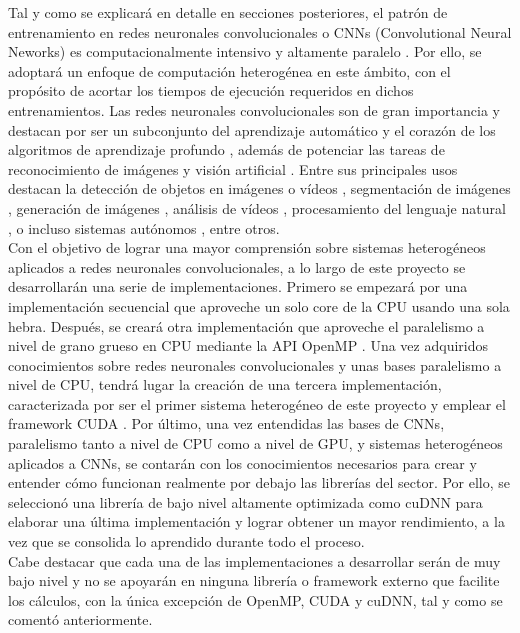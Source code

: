 Tal y como se explicará en detalle en secciones posteriores, el patrón de entrenamiento en redes neuronales convolucionales o CNNs (Convolutional Neural Neworks) \cite{CNN_definicion} es computacionalmente intensivo y altamente paralelo \cite{Programming_Massively}. Por ello, se adoptará un enfoque de computación heterogénea en este ámbito, con el propósito de acortar los tiempos de ejecución requeridos en dichos entrenamientos. Las redes neuronales convolucionales son de gran importancia y destacan por ser un subconjunto del aprendizaje automático \cite{Aprendizaje_automatico_definicion} y el corazón de los algoritmos de aprendizaje profundo \cite{Deep_learning_definicion}, además de potenciar las tareas de reconocimiento de imágenes \cite{image_recognition_CNN} y visión artificial \cite{computer_vision_definicion}. Entre sus principales usos destacan la detección de objetos en imágenes o vídeos \cite{object_detection_CNN}, segmentación de imágenes \cite{image_segmentation_CNN} , generación de imágenes \cite{generative_CNN}, análisis de vídeos \cite{video_analytics_CNN}, procesamiento del lenguaje natural \cite{NLP_CNN}, o incluso sistemas autónomos \cite{sitemas_autonomos_CNN}, entre otros. \\
Con el objetivo de lograr una mayor comprensión sobre sistemas heterogéneos aplicados a redes neuronales convolucionales, a lo largo de este proyecto se desarrollarán una serie de implementaciones. Primero se empezará por una implementación secuencial que aproveche un solo core de la CPU usando una sola hebra. Después, se creará otra implementación que aproveche el paralelismo a nivel de grano grueso en CPU mediante la API OpenMP \cite{openmp_forum}. Una vez adquiridos conocimientos sobre redes neuronales convolucionales y unas bases paralelismo a nivel de CPU, tendrá lugar la creación de una tercera implementación, caracterizada por ser el primer sistema heterogéneo de este proyecto y emplear el framework CUDA \cite{cuda_forum}. Por último, una vez entendidas las bases de CNNs, paralelismo tanto a nivel de CPU como a nivel de GPU, y sistemas heterogéneos aplicados a CNNs, se contarán con los conocimientos necesarios para crear y entender cómo funcionan realmente por debajo las librerías del sector. Por ello, se seleccionó una librería de bajo nivel altamente optimizada como cuDNN \cite{cuDNN} para elaborar una última implementación y lograr obtener un mayor rendimiento, a la vez que se consolida lo aprendido durante todo el proceso. \\
Cabe destacar que cada una de las implementaciones a desarrollar serán de muy bajo nivel y no se apoyarán en ninguna librería o framework externo que facilite los cálculos, con la única excepción de OpenMP, CUDA y cuDNN, tal y como se comentó anteriormente. 


